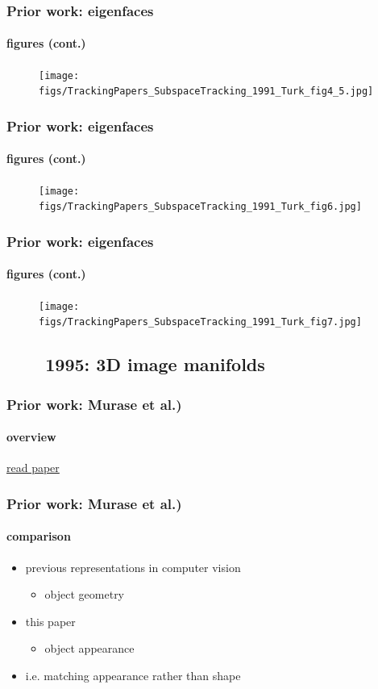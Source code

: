 \begin{frame}
\frametitle{Prior work: eigenfaces}
\framesubtitle{figures (cont.)}
\mypagenum
	\begin{figure}
		\texttt{[image: figs/TrackingPapers\_SubspaceTracking\_1991\_Turk\_fig4\_5.jpg]}
	\end{figure}
\end{frame}


\begin{frame}
\frametitle{Prior work: eigenfaces}
\framesubtitle{figures (cont.)}
\mypagenum
	\begin{figure}
		\texttt{[image: figs/TrackingPapers\_SubspaceTracking\_1991\_Turk\_fig6.jpg]}
	\end{figure}
\end{frame}


\begin{frame}
\frametitle{Prior work: eigenfaces}
\framesubtitle{figures (cont.)}
\mypagenum
	\begin{figure}
		\texttt{[image: figs/TrackingPapers\_SubspaceTracking\_1991\_Turk\_fig7.jpg]}
	\end{figure}
\end{frame}


\subsection{\ \ \ \ 1995: 3D image manifolds}
\begin{frame}
\frametitle{Prior work: Murase et al.)}
\framesubtitle{overview}
\mypagenum
	{\color{blue}  \href{http://users.ece.gatech.edu/~msalman/papers/1995 JNL, Visual learning and recognition of 3-d objects from appearance (Murase).pdf}{read paper}}
\end{frame}



\begin{frame}
\frametitle{Prior work: Murase et al.)}
\framesubtitle{comparison}
\mypagenum
	\begin{itemize}
		\item previous representations in computer vision
			\begin{itemize}
				\item object geometry
			\end{itemize} 
		\item this paper
			\begin{itemize}
				\item object appearance
			\end{itemize} 
		\item i.e. matching appearance rather than shape
	\end{itemize}
\end{frame}




